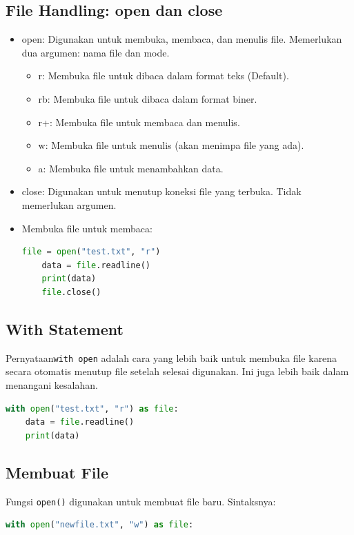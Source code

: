 \documentclass{article}
\begin{document}
\subsection{File Handling: open dan close}
\begin{itemize}
    \item open: Digunakan untuk membuka, membaca, dan menulis file. Memerlukan dua argumen: nama file dan mode.
          \begin{itemize}
              \item r: Membuka file untuk dibaca dalam format teks (Default).
              \item rb: Membuka file untuk dibaca dalam format biner.
              \item r+: Membuka file untuk membaca dan menulis.
              \item w: Membuka file untuk menulis (akan menimpa file yang ada).
              \item a: Membuka file untuk menambahkan data.
          \end{itemize}
    \item close: Digunakan untuk menutup koneksi file yang terbuka. Tidak memerlukan argumen.
    \item Membuka file untuk membaca:
          \begin{lstlisting}[language=Python, caption={}, captionpos=b]
    file = open("test.txt", "r")
    data = file.readline()
    print(data)
    file.close()
    \end{lstlisting}
\end{itemize}

\subsection{With Statement}
Pernyataan\verb|with open| adalah cara yang lebih baik untuk membuka file karena secara otomatis menutup file setelah selesai digunakan. Ini juga lebih baik dalam menangani kesalahan.
\begin{lstlisting}[language=Python, caption={}, captionpos=b]
with open("test.txt", "r") as file:
    data = file.readline()
    print(data)
\end{lstlisting}

\subsection{Membuat File}
Fungsi \verb|open()| digunakan untuk membuat file baru. Sintaksnya:
\begin{lstlisting}[language=Python, caption={}, captionpos=b]
with open("newfile.txt", "w") as file:
\end{lstlisting}
\end{document}
